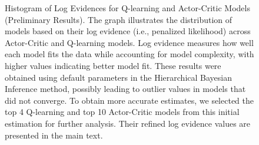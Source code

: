 \documentclass[
  number,
  preprint,
  3p,
  onecolumn]{elsarticle}
\begin{document}
\begin{figure}


\caption{\label{fig-log-evidence-histogram}Histogram of Log Evidences
for Q-learning and Actor-Critic Models (Preliminary Results). The graph
illustrates the distribution of models based on their log evidence
(i.e., penalized likelihood) across Actor-Critic and Q-learning models.
Log evidence measures how well each model fits the data while accounting
for model complexity, with higher values indicating better model fit.
These results were obtained using default parameters in the Hierarchical
Bayesian Inference method, possibly leading to outlier values in models
that did not converge. To obtain more accurate estimates, we selected
the top 4 Q-learning and top 10 Actor-Critic models from this initial
estimation for further analysis. Their refined log evidence values are
presented in the main text.}

\end{figure}%
\end{document}
